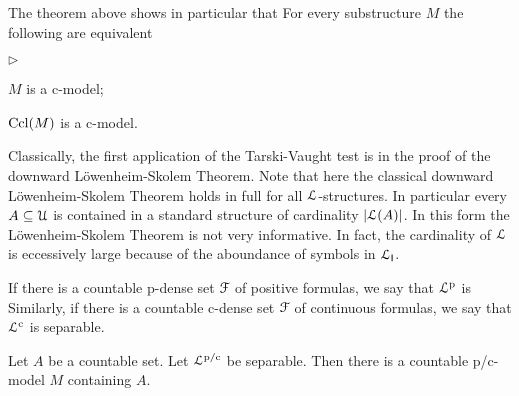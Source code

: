 \documentclass[10pt,oneside]{amsproc}
\newcommand{\mylabel}[1]{{#1}\hfill}
\renewenvironment{itemize}
  {\begin{list}{$\triangleright$}{%
  \setlength{\parskip}{0mm}
  \setlength{\topsep}{.4\baselineskip}
  \setlength{\rightmargin}{0mm}
  \setlength{\listparindent}{0mm}
  \setlength{\itemindent}{0mm}
  \setlength{\labelwidth}{3ex}
  \setlength{\itemsep}{.2\baselineskip}
  \setlength{\parsep}{.2\baselineskip}
  \setlength{\partopsep}{0mm}
  \setlength{\labelsep}{1ex}
  \setlength{\leftmargin}{\labelwidth+\labelsep}
  \let\makelabel\mylabel}}{%
\end{list}}
\renewcommand*{\emph}[1]{%
   \smash{\tikz[baseline]\node[rectangle, fill=teal!25, rounded corners, inner xsep=0.5ex, inner ysep=0.2ex, anchor=base, minimum height = 2.7ex]{\strut #1};}}
\begin{document}
{%
    
   


\begin{remark}\label{rem_Tarski_Vaught}
  The theorem above shows in particular that For every substructure $M$ the following are equivalent
  \begin{itemize}
    \item[1.] $M$ is a c-model;
    \item[2.] ${\rm Ccl}(M)$ is a c-model.
  \end{itemize}
\end{remark}

Classically, the first application of the Tarski-Vaught test is in the proof of the downward L\"owen\-heim-Skolem Theorem.
Note that here the classical downward L\"owenheim-Skolem Theorem holds in full for all ${\EuScript L}$-structures.
In particular every $A\subseteq{\EuScript U}$ is contained in a standard structure of cardinality $|{\EuScript L}(A)|$.
In this form the L\"owenheim-Skolem Theorem is not very informative.
In fact, the cardinality of ${\EuScript L}$ is eccessively large because of the aboundance of symbols in ${\EuScript L}_{\sf I}$.

If there is a countable p-dense set ${\EuScript F}$ of positive formulas, we say that ${\EuScript L}^{\rm p}$ is \emph{separable.} 
Similarly, if there is a countable c-dense set ${\EuScript F}$ of continuous formulas, we say that ${\EuScript L}^{\rm c}$ is separable.

\begin{proposition}
  Let $A$ be a countable set.
  Let ${\EuScript L}^{\rm p/c}$ be separable.
  Then there is a countable p/c-model $M$ containing $A$.
\end{proposition}

}
\end{document}
